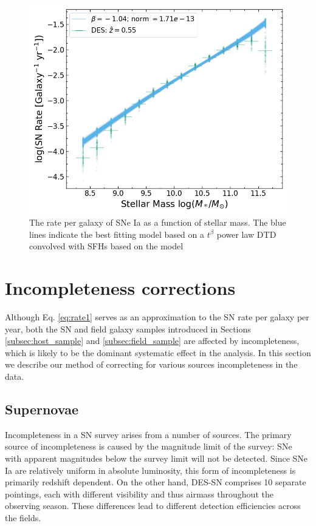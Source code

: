\documentclass[fleqn,usenatbib]{mnras}
\begin{document}
\begin{figure}
    \centering
    \includegraphics[width=.5\textwidth]{figs/rate_vs_mass_DTD_fit_beta_norm.png}
    \caption{The rate per galaxy of SNe Ia as a function of stellar mass. The blue lines indicate the best fitting model based on a $t^{\beta}$ power law DTD convolved with SFHs based on the \citet{Childress2014} model}
    \label{fig:rate_fit}
\end{figure}
\section{Incompleteness corrections \label{sec:incompleteness}}

Although Eq. \ref{eq:rate1} serves as an approximation to the SN rate per galaxy per year, both the SN and field galaxy samples introduced in Sections \ref{subsec:host_sample} and \ref{subsec:field_sample} are affected by incompleteness, which is likely to be the dominant systematic effect in the analysis. In this section we describe our method of correcting for various sources incompleteness in the data.

\subsection{Supernovae \label{subsec:incompleteness_SNe}}

Incompleteness in a SN survey arises from a number of sources. The primary source of incompleteness is caused by the magnitude limit of the survey: SNe with apparent magnitudes below the survey limit will not be detected. Since SNe Ia are relatively uniform in absolute luminosity, this form of incompleteness is primarily redshift dependent. On the other hand, DES-SN comprises 10 separate pointings, each with different visibility and thus airmass throughout the observing season. These differences lead to different detection efficiencies across the fields.
\end{document}
